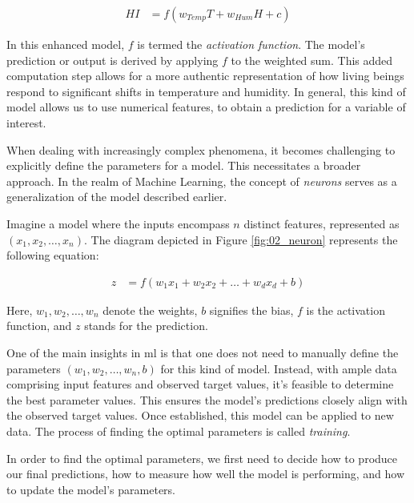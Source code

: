 \begin{align*}
HI &= f(w_{Temp} T + w_{Hum} H + c)
\end{align*}

In this enhanced model, $f$ is termed the \emph{activation function}. The model's prediction or output is derived by applying $f$ to the weighted sum. This added computation step allows for a more authentic representation of how living beings respond to significant shifts in temperature and humidity. 
In general, this kind of model allows us to use numerical features, to obtain a prediction for a variable of interest.

\label{02_nn_neurons}




When dealing with increasingly complex phenomena, it becomes challenging to explicitly define the parameters for a model. This necessitates a broader approach. In the realm of Machine Learning, the concept of \emph{neurons} serves as a generalization of the model described earlier.



Imagine a model where the inputs encompass $n$ distinct features, represented as $(x_1, x_2,\ldots,x_n)$. The diagram depicted in Figure \ref{fig:02_neuron} represents the following equation:

\begin{align*}
z &= f(w_1 x_1 + w_2 x_2 + \ldots + w_d x_d + b)
\end{align*}

Here, $w_1, w_2,\ldots,w_n$ denote the weights, $b$ signifies the bias, $f$ is the activation function, and $z$ stands for the prediction.

One of the main insights in \gls{ml} is that one does not need to manually define the parameters $(w_1, w_2,\ldots,w_n,b)$ for this kind of model.
Instead, with ample data comprising input features and observed target values, it's feasible to determine the best parameter values. This ensures the model's predictions closely align with the observed target values. Once established, this model can be applied to new data. The process of finding the optimal parameters is called \emph{training}.

In order to find the optimal parameters, we first need to decide how to produce our final predictions, how to measure how well the model is performing, and how to update the model's parameters.


\label{02_nn_activation_functions}


